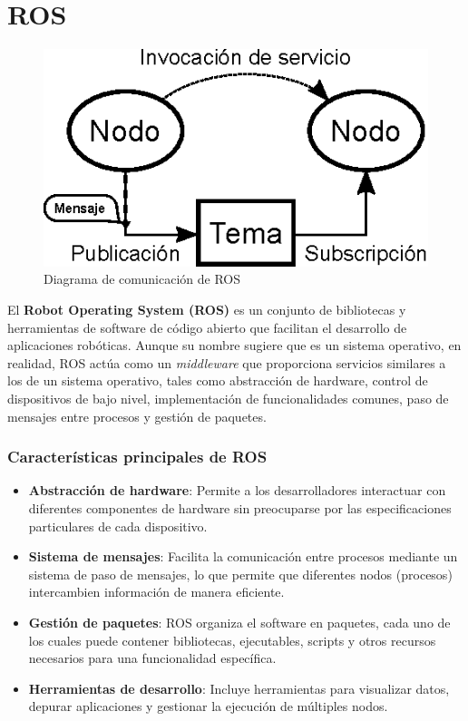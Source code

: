 \section{ROS} \label{sec:ros}

\begin{figure}[h]
	\centering
	\includegraphics[width=0.5\linewidth]{img/ROS_concepts}
	\caption{Diagrama de comunicación de ROS}
	\label{fig:rosconcepts}
\end{figure}

El \textbf{Robot Operating System (ROS)} es un conjunto de bibliotecas y herramientas de software de código abierto que facilitan el desarrollo de aplicaciones robóticas. Aunque su nombre sugiere que es un sistema operativo, en realidad, ROS actúa como un \textit{middleware} que proporciona servicios similares a los de un sistema operativo, tales como abstracción de hardware, control de dispositivos de bajo nivel, implementación de funcionalidades comunes, paso de mensajes entre procesos y gestión de paquetes. 

\subsubsection{Características principales de ROS}

\begin{itemize}
	\item \textbf{Abstracción de hardware}: Permite a los desarrolladores interactuar con diferentes componentes de hardware sin preocuparse por las especificaciones particulares de cada dispositivo.
	\item \textbf{Sistema de mensajes}: Facilita la comunicación entre procesos mediante un sistema de paso de mensajes, lo que permite que diferentes nodos (procesos) intercambien información de manera eficiente.
	\item \textbf{Gestión de paquetes}: ROS organiza el software en paquetes, cada uno de los cuales puede contener bibliotecas, ejecutables, scripts y otros recursos necesarios para una funcionalidad específica.
	\item \textbf{Herramientas de desarrollo}: Incluye herramientas para visualizar datos, depurar aplicaciones y gestionar la ejecución de múltiples nodos.
\end{itemize}

